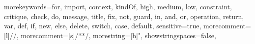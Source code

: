 {morekeywords={for, import, context, kindOf, high, medium, low, constraint, critique, check, do, message, title, fix, not, guard, in, and, or, operation, return, var, def, if, new, else, delete, switch, case, default},
sensitive=true,
morecomment=[l]{//},
morecomment=[s]{/*}{*/},
morestring=[b]",
showstringspaces=false,
}
